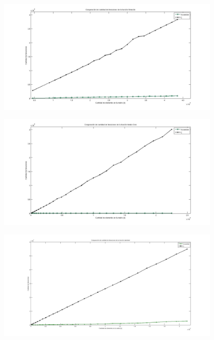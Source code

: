 \documentclass[10pt, a4paper]{article}
\begin{document}
\begin{figure}[H] %
\begin{center}
\includegraphics[width=500pt]{../imgs/comparacion_rotacion.jpg}
\end{center}
\end{figure}
\begin{figure}[H] %
\begin{center}
\includegraphics[width=500pt]{../imgs/comparacion_mediaCero.jpg}
\end{center}
\end{figure}
\begin{figure}[H] %
\begin{center}
\includegraphics[width=500pt]{../imgs/comparacion_identidad.jpg}
\end{center}
\end{figure}
\end{document}
